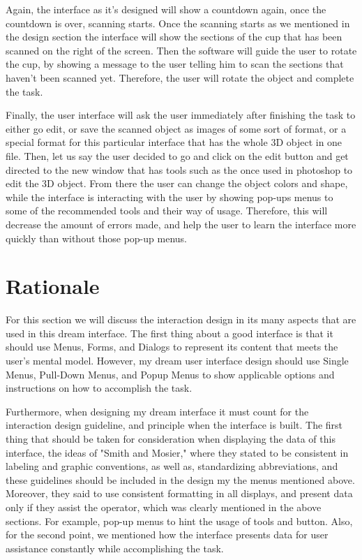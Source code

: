 \documentclass[12pt, oneside]{amsart}   	%
\begin{document}
Again, the interface as it's designed will show a countdown again, once the countdown is over, scanning starts.  Once the scanning starts as we mentioned in the design section the interface will show the sections of the cup that has been scanned on the right of the screen.  Then the software will guide the user to rotate the cup, by showing a message to the user telling him to scan the sections that haven't been scanned yet.  Therefore, the user will rotate the object and complete the task. 

Finally, the user interface will ask the user immediately after finishing the task to either go edit, or save the scanned object as images of some sort of format, or a special format for this particular interface that has the whole 3D object in one file. Then, let us say the user decided to go and click on the edit button and get directed to the new window that has tools such as the once used in photoshop to edit the 3D object.  From there the user can change the object colors and shape, while the interface is interacting with the user by showing pop-ups menus to some of the recommended tools and their way of usage.  Therefore, this will decrease the amount of errors made, and help the user to learn the interface more quickly than without those pop-up menus.  

\section{Rationale}

For this section we will discuss the interaction design in its many aspects that are used in this dream interface. The first thing about a good interface is that it should use Menus, Forms, and Dialogs to represent its content that meets the user's mental model. However, my dream user interface design should use Single Menus, Pull-Down Menus, and Popup Menus to show applicable options and instructions on how to accomplish the task. 

Furthermore, when designing my dream interface it must count for the interaction design guideline, and principle when the interface is built. The first thing that should be taken for consideration when displaying the data of this interface, the ideas of "Smith and Mosier," where they stated to be consistent in labeling and graphic conventions, as well as, standardizing abbreviations, and these guidelines should be included in the design my the menus mentioned above.  Moreover, they said to use consistent formatting in all displays, and present data only if they assist the operator, which was clearly mentioned in the above sections.  For example, pop-up menus to hint the usage of tools and button.  Also, for the second point, we mentioned how the interface presents data for user assistance constantly while accomplishing the task.
\end{document}
